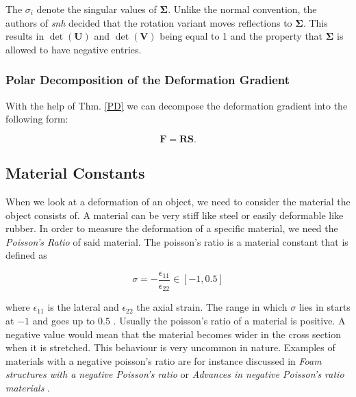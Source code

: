 The $\sigma_i$ denote the singular values of $\mathbf{\Sigma}$. Unlike the normal convention, the authors of \textit{\acrshort{snh}} decided that the rotation variant moves reflections to $\mathbf{\Sigma}$. This results in $\operatorname{det}(\mathbf{U})$ and $\operatorname{det}(\mathbf{V})$ being equal to 1 and the property that $\mathbf{\Sigma}$ is allowed to have negative entries.




\subsubsection{Polar Decomposition of the Deformation Gradient}
With the help of Thm. \ref{PD} we can decompose the deformation gradient into the following form:

\[
\mathbf{F} = \mathbf{RS}.
\]



\subsection{Material Constants}
When we look at a deformation of an object, we need to consider the material the object consists of. A material can be very stiff like steel or easily deformable like rubber. In order to measure the deformation of a specific material, we need the \textit{Poisson's Ratio} of said material. The poisson's ratio is a material constant that is defined as 

\begin{equation}\label{eq:poisson}
\sigma = - \frac{\epsilon_{11}}{\epsilon_{22}} \in [-1, 0.5]
\end{equation}

where $\epsilon_{11}$ is the lateral and $\epsilon_{22}$ the axial strain. The range in which $\sigma$ lies in starts at $-1$ and goes up to $0.5$ \cite{PhysRevB.80.132104}. Usually the poisson's ratio of a material is positive. A negative value would mean that the material becomes wider in the cross section when it is stretched. This behaviour is very uncommon in nature. Examples of materials with a negative poisson's ratio are for instance discussed in \textit{Foam structures with a negative Poisson's ratio} \cite{lakes1987foam} or \textit{Advances in negative Poisson's ratio materials} \cite{lakes1993advances}.

